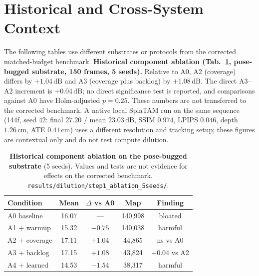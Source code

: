 \documentclass[10pt,twocolumn,letterpaper]{article}
\begin{document}
\section{Historical and Cross-System Context}
The following tables use different substrates or protocols from the corrected matched-budget benchmark.
\textbf{Historical component ablation (Tab.~\ref{tab:histablation}, pose-bugged substrate, 150 frames, 5 seeds).} Relative to A0, A2 (coverage) differs by $+1.04\,\mathrm{dB}$ and A3 (coverage plus backlog) by $+1.08\,\mathrm{dB}$. The direct A3--A2 increment is $+0.04\,\mathrm{dB}$; no direct significance test is reported, and comparisons against A0 have Holm-adjusted $p=0.25$. These numbers are not transferred to the corrected benchmark.
A native local SplaTAM run on the same sequence (144f, seed 42: final $27.20$ / mean $23.03\,\mathrm{dB}$, SSIM $0.974$, LPIPS $0.046$, depth $1.26\,\mathrm{cm}$, ATE $0.41\,\mathrm{cm}$) uses a different resolution and tracking setup; these figures are contextual only and do not test compute dilution.

\begin{table}[tbp]
\centering
\footnotesize\setlength{\tabcolsep}{3pt}
\begin{tabular}{lcccc}
\toprule
\textbf{Condition} & \textbf{Mean} & \textbf{$\Delta$ vs A0} & \textbf{Map} & \textbf{Finding} \\
\midrule
A0 baseline & 16.07 & --- & 140,998 & bloated \\
A1 + warmup & 15.32 & $-0.75$ & 140,038 & harmful \\
A2 + coverage & 17.11 & $+1.04$ & 44,865 & ns vs A0 \\
A3 + backlog & 17.15 & $+1.08$ & 43,824 & $+0.04$ vs A2 \\
A4 + learned & 14.53 & $-1.54$ & 38,317 & harmful \\
\bottomrule
\end{tabular}
\caption{\textbf{Historical component ablation on the pose-bugged substrate} (5 seeds). Values and tests are not evidence for effects on the corrected benchmark. \texttt{results/dilution/step1\_ablation\_5seeds/}.}
\label{tab:histablation}
\end{table}
\end{document}
